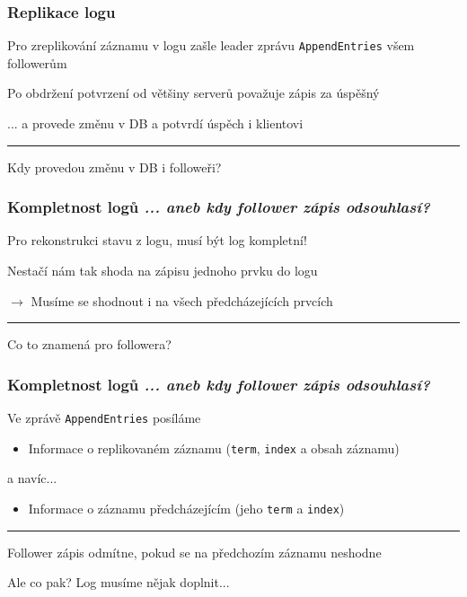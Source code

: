 \documentclass[usenames,dvipsnames,9pt]{beamer}
\begin{document}
\begin{frame}
  \frametitle{Replikace logu}

  {\large Pro zreplikování záznamu v logu zašle leader zprávu \texttt{AppendEntries} všem followerům}

  \vspace{2em}

  \pause
  {\large Po obdržení potvrzení od většiny serverů považuje zápis za úspěšný}

  \hfill ... a provede změnu v DB a potvrdí úspěch i klientovi

  \pause
  \vspace{3em}\hrule\vspace{1em}
  \begin{center}
    \LARGE Kdy provedou změnu v DB i followeři?
  \end{center}


\end{frame}

\begin{frame}
  \frametitle{Kompletnost logů \hfill \emph{... aneb kdy follower zápis odsouhlasí?}}

  {\Large Pro rekonstrukci stavu z logu, musí být log kompletní!}

  \hfill {Nestačí nám tak shoda na zápisu jednoho prvku do logu}

  \hfill {$\rightarrow$ Musíme se shodnout i na všech předcházejících prvcích}

  \pause\vspace{3em}\hrule\vspace{1em}
  \begin{center}
    \LARGE Co to znamená pro followera?
  \end{center}
\end{frame}

\begin{frame}
  \frametitle{Kompletnost logů \hfill \emph{... aneb kdy follower zápis odsouhlasí?}}

  Ve zprávě \texttt{AppendEntries} posíláme
  \begin{itemize}
    \item Informace o replikovaném záznamu (\texttt{term}, \texttt{index} a obsah záznamu)
  \end{itemize}

  a navíc...
  \begin{itemize}
    \item Informace o záznamu předcházejícím (jeho \texttt{term} a \texttt{index})
  \end{itemize}

  \pause\vspace{3em}\hrule\vspace{1em}
  \begin{center}
    \large Follower zápis odmítne, pokud se na předchozím záznamu neshodne
  \end{center}

  \pause\hfill {\LARGE Ale co pak?} Log musíme nějak doplnit...
\end{frame}
\end{document}
